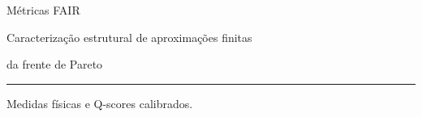 \setlength{\parskip}{3.5pt}
\newcommand{\FairAxes}{%
 \draw[->,gray!75] (-.12,0)--(6.25,0) node[below left,font=\scriptsize]{$f_1$};
 \draw[->,gray!75] (0,-.12)--(0,5.05) node[above left,font=\scriptsize]{$f_2$};}
\newcommand{\FairCurve}{\draw[very thick,fairref] plot[smooth] coordinates{(.8,4.35)(1.65,3.20)(2.65,2.38)(3.75,1.60)(5.45,.85)};}
\newcommand{\FairPt}[2]{\fill[fairwarm] (#1,#2) circle (3.1pt);}
\newcommand{\FairRefPt}[2]{\fill[fairref] (#1,#2) circle (2.0pt);}
\newcommand{\FairLegend}{\tikz[baseline=-.4ex]{\fill[fairref] (0,0) circle (2pt);}\,\scriptsize referência $R$\hspace{.6cm}\tikz[baseline=-.4ex]{\fill[fairwarm] (0,0) circle (2.7pt);}\,\scriptsize aproximação $P$}

\begin{frame}[plain]
\vspace*{2.0cm}
{\LARGE\color{navy}Métricas FAIR\par}
\vspace{.22cm}
{\large Caracterização estrutural de aproximações finitas\par}
{\large da frente de Pareto\par}
\vspace{.30cm}
\textcolor{navy!40}{\rule{.76\linewidth}{.65pt}}\par
\vspace{.20cm}
Medidas físicas e Q-scores calibrados.
\end{frame}

